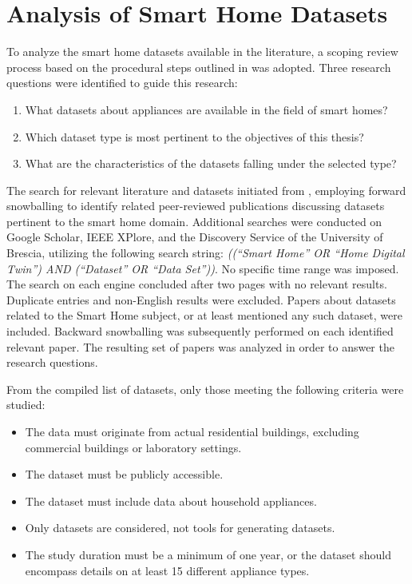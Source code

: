 \chapter{Analysis of Smart Home Datasets}\label{ch:analysis_of_smart_home_datasets}

To analyze the smart home datasets available in the literature, a scoping review process based on the procedural steps outlined in \parencite{makStepsConductingScoping2022} was adopted. Three research questions were identified to guide this research:
\begin{enumerate}[label={RQ\arabic*.}, leftmargin=3.5em]
    \item What datasets about appliances are available in the field of smart homes?
    \item Which dataset type is most pertinent to the objectives of this thesis?
    \item What are the characteristics of the datasets falling under the selected type?
\end{enumerate}

The search for relevant literature and datasets initiated from \parencite{barkerSmartOpenData2012}, employing forward snowballing to identify related peer-reviewed publications discussing datasets pertinent to the smart home domain. Additional searches were conducted on Google Scholar, IEEE XPlore, and the Discovery Service of the University of Brescia, utilizing the following search string: \textit{((``Smart Home'' OR ``Home Digital Twin'') AND (``Dataset'' OR ``Data Set''))}. No specific time range was imposed. The search on each engine concluded after two pages with no relevant results. Duplicate entries and non-English results were excluded. Papers about datasets related to the Smart Home subject, or at least mentioned any such dataset, were included. Backward snowballing was subsequently performed on each identified relevant paper. The resulting set of papers was analyzed in order to answer the research questions.

From the compiled list of datasets, only those meeting the following criteria were studied:
\begin{itemize}
    \item The data must originate from actual residential buildings, excluding commercial buildings or laboratory settings.
    \item The dataset must be publicly accessible.
    \item The dataset must include data about household appliances.
    \item Only datasets are considered, not tools for generating datasets.
    \item The study duration must be a minimum of one year, or the dataset should encompass details on at least 15 different appliance types.
\end{itemize}

